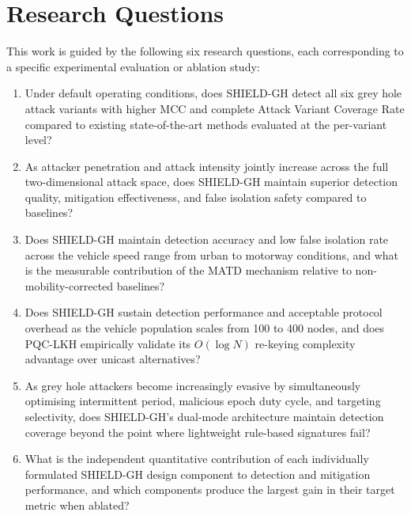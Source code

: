 \documentclass[12pt, a4paper]{report}
\begin{document}
\section{Research Questions}
\label{sec:rq}

This work is guided by the following six research questions, each
corresponding to a specific experimental evaluation or ablation study:

\begin{enumerate}
  \item[\textbf{RQ1.}] Under default operating conditions, does SHIELD-GH
  detect all six grey hole attack variants with higher MCC and complete
  Attack Variant Coverage Rate compared to existing state-of-the-art
  methods evaluated at the per-variant level?

  \item[\textbf{RQ2.}] As attacker penetration and attack intensity
  jointly increase across the full two-dimensional attack space, does
  SHIELD-GH maintain superior detection quality, mitigation
  effectiveness, and false isolation safety compared to baselines?

  \item[\textbf{RQ3.}] Does SHIELD-GH maintain detection accuracy and low
  false isolation rate across the vehicle speed range from urban to
  motorway conditions, and what is the measurable contribution of the
  MATD mechanism relative to non-mobility-corrected baselines?

  \item[\textbf{RQ4.}] Does SHIELD-GH sustain detection performance and
  acceptable protocol overhead as the vehicle population scales from
  100 to 400 nodes, and does PQC-LKH empirically validate its
  $O(\log N)$ re-keying complexity advantage over unicast alternatives?

  \item[\textbf{RQ5.}] As grey hole attackers become increasingly
  evasive by simultaneously optimising intermittent period, malicious
  epoch duty cycle, and targeting selectivity, does SHIELD-GH's
  dual-mode architecture maintain detection coverage beyond the point
  where lightweight rule-based signatures fail?

  \item[\textbf{RQ6.}] What is the independent quantitative contribution
  of each individually formulated SHIELD-GH design component to
  detection and mitigation performance, and which components produce
  the largest gain in their target metric when ablated?
\end{enumerate}
\end{document}
